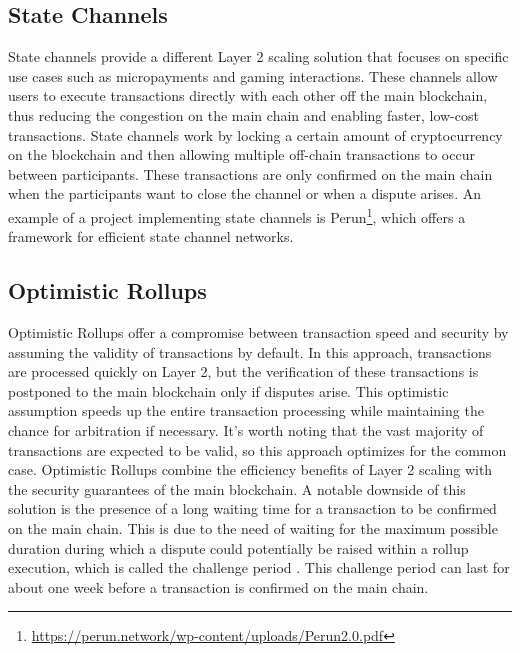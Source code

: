 \subsection{State Channels}
State channels provide a different Layer 2 scaling solution that focuses on specific use cases such as micropayments and gaming interactions. These channels allow users to execute transactions directly with each other off the main blockchain, thus reducing the congestion on the main chain and enabling faster, low-cost transactions\cite{negka_blockchain_2021}. State channels work by locking a certain amount of cryptocurrency on the blockchain and then allowing multiple off-chain transactions to occur between participants. These transactions are only confirmed on the main chain when the participants want to close the channel or when a dispute arises. An example of a project implementing state channels is Perun\footnote{\url{https://perun.network/wp-content/uploads/Perun2.0.pdf}}, which offers a framework for efficient state channel networks.

\subsection{Optimistic Rollups \label{subsec:optimisticRollups}}
Optimistic Rollups offer a compromise between transaction speed and security by assuming the validity of transactions by default\cite{thibault_blockchain_2022}. In this approach, transactions are processed quickly on Layer 2, but the verification of these transactions is postponed to the main blockchain only if disputes arise. This optimistic assumption speeds up the entire transaction processing while maintaining the chance for arbitration if necessary. It's worth noting that the vast majority of transactions are expected to be valid, so this approach optimizes for the common case. Optimistic Rollups combine the efficiency benefits of Layer 2 scaling with the security guarantees of the main blockchain. A notable downside of this solution is the presence of a long waiting time for a transaction to be confirmed on the main chain. This is due to the need of waiting for the maximum possible duration during which a dispute could potentially be raised within a rollup execution, which is called the challenge period \cite{negka_blockchain_2021}. This challenge period can last for about one week before a transaction is confirmed on the main chain.


